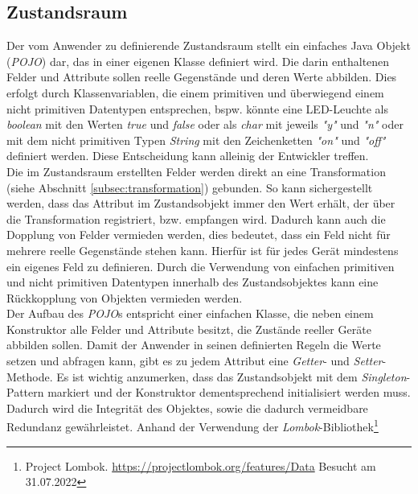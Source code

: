 \subsection{Zustandsraum}
\label{subsec:zustandsraum}
    Der vom Anwender zu definierende Zustandsraum stellt ein einfaches Java Objekt (\textit{\acs{POJO}}) dar, das in einer eigenen Klasse definiert wird. 
    Die darin enthaltenen Felder und Attribute sollen reelle Gegenstände und deren Werte abbilden. Dies erfolgt durch 
    Klassenvariablen, die einem primitiven und überwiegend einem nicht primitiven Datentypen entsprechen, bspw. könnte eine LED-Leuchte als \textit{boolean} mit den 
    Werten \textit{true} und \textit{false} oder als \textit{char} mit jeweils \textit{"y"} und \textit{"n"} oder mit dem nicht primitiven 
    Typen \textit{String} mit den Zeichenketten \textit{"on"} und \textit{"off"} definiert 
    werden. Diese Entscheidung kann alleinig der Entwickler treffen. 
    \\
    \linebreak
    Die im Zustandsraum erstellten Felder werden direkt an eine Transformation (siehe Abschnitt \ref{subsec:transformation}) gebunden. So kann sichergestellt werden, dass 
    das Attribut im Zustandsobjekt immer den Wert erhält, der über die Transformation registriert, bzw. empfangen wird. Dadurch kann 
    auch die Dopplung von Felder vermieden werden, dies bedeutet, dass ein Feld nicht für mehrere reelle Gegenstände stehen kann. Hierfür ist für jedes 
    Gerät mindestens ein eigenes Feld zu definieren. Durch die Verwendung von einfachen primitiven und nicht primitiven Datentypen innerhalb 
    des Zustandsobjektes kann eine Rückkopplung von Objekten vermieden werden. 
    \\
    \linebreak
    Der Aufbau des \textit{\acs{POJO}}s entspricht einer einfachen Klasse, die neben einem Konstruktor alle Felder und Attribute besitzt, die Zustände reeller 
    Geräte abbilden sollen. Damit der Anwender in seinen definierten Regeln die Werte setzen und abfragen kann, gibt es zu jedem Attribut eine \textit{Getter}- und \textit{Setter}-Methode.
    Es ist wichtig anzumerken, dass das Zustandsobjekt mit dem \textit{Singleton}-Pattern markiert und der Konstruktor dementsprechend initialisiert werden muss. Dadurch wird 
    die Integrität des Objektes, sowie die dadurch vermeidbare Redundanz gewährleistet. Anhand der Verwendung der \textit{Lombok}-Bibliothek\footnote{Project Lombok. \url{https://projectlombok.org/features/Data} Besucht am 31.07.2022} 
